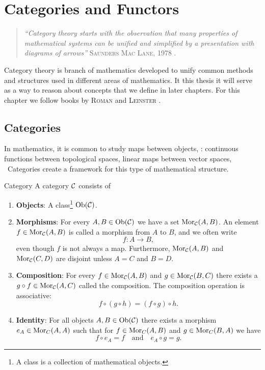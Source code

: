 \chapter{Categories and Functors}
\label{chapter__category_theory}

\begin{quote}
\textit{``Category theory starts with the observation that many properties of mathematical systems can be unified and simplified by a presentation with diagrams of arrows''} \hfill \textsc{Saunders Mac Lane}, 1978 \cite[p.~1]{MacLane1978}. \hspace*{5mm}
\end{quote}

Category theory is branch of mathematics developed to unify common methods and structures used in different areas of mathematics. 
It this thesis it will serve as a way to reason about concepts that we define in later chapters. For this chapter we follow books by \textsc{Roman} \cite{Roman2017} and \textsc{Leinster} \cite{Leinster2014-dc}.

\section{Categories}

In mathematics, it is common to study maps between objects, \eg: continuous functions between topological spaces, linear maps between vector spaces, \etc\
Categories create a framework for this type of mathematical structure.

\begin{definition}{Category \cite[Sec.~1.2]{Roman2017}}{}
A category $\mathcal{C}$ consists of
\begin{enumerate}
    \item \textbf{Objects}: A class\footnote{A class is a collection of mathematical objects.} $\mathrm {Ob}(\mathcal{C})$.
    
    \item \textbf{Morphisms}: For every $A, B \in \mathrm {Ob}(\mathcal{C})$ we have a set $\mathrm {Mor}_{\mathcal{C}}(A,B)$. An element $f \in \mathrm {Mor}_{\mathcal{C}}(A,B)$ is called a morphism from $A$ to $B$, and we often write 
    $$
    f\colon A \to B,
    $$
    even though $f$ is not always a map. Furthermore, $\mathrm {Mor}_{\mathcal{C}}(A,B)$ and $\mathrm {Mor}_{\mathcal{C}}(C,D)$ are disjoint unless $A = C$ and $B = D$.
    
    \item \textbf{Composition}: For every $f \in \mathrm {Mor}_{\mathcal{C}}(A,B)$ and $g \in \mathrm {Mor}_{\mathcal{C}}(B,C)$ there exists a $g \circ f \in \mathrm {Mor}_{\mathcal{C}}(A,C)$ called the composition. The composition operation is associative: 
    $$
    f \circ (g \circ h) = (f \circ g) \circ h.
    $$

    \item \textbf{Identity}: For all objects $A,B \in \mathrm {Ob}(\mathcal{C})$ there exists a morphism ${e_A \in \mathrm {Mor}_C(A,A)}$ such that for $f \in \mathrm {Mor}_C(A,B)$ and $g \in \mathrm {Mor}_C(B,A)$ we have
    $$
    f \circ e_A = f \quad \text{and} \quad e_A \circ g = g.
    $$
\end{enumerate}
\end{definition}

